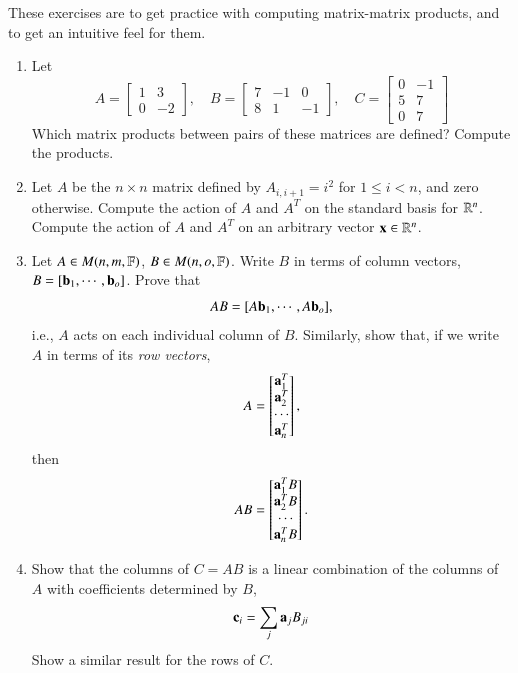 \documentclass[12pt]{report}
\begin{document}
These exercises are to get practice with computing matrix-matrix products, and to get an intuitive feel for them.
\begin{enumerate}
    \item {} Let 
    \begin{equation}
        A = \begin{bmatrix} 1 & 3 \\ 0 & -2 \end{bmatrix}, \quad B = \begin{bmatrix} 7 & -1 & 0 \\ 8 & 1 & -1 \end{bmatrix}, \quad C = \begin{bmatrix} 0 & -1 \\ 5 & 7 \\ 0 & 7 \end{bmatrix}
    \end{equation}
    Which matrix products between pairs of these matrices are defined? Compute the products.
    \item{} 
    Let $A$ be the $n\times n$ matrix defined by $A_{i,i+1} = i^2$ for $1 \leq i < n$, and zero otherwise. Compute the action of $A$ and $A^T$ on the standard basis for $\mathbb{R}^n$. Compute the action of $A$ and $A^T$ on an arbitrary vector $\mathbf{x}\in \mathbb{R}^n$.
    \item
    Let $A \in M(n,m,\mathbb{F})$, $B \in M(n,o,\mathbb{F})$. Write $B$ in terms of column vectors, $B = [\mathbf{b}_1,\cdots,\mathbf{b}_o]$. Prove that
    \begin{equation}
        AB = [A\mathbf{b}_1, \cdots, A\mathbf{b}_o],
    \end{equation}
    i.e., $A$ acts on each individual column of $B$.     
    Similarly, show that, if we write $A$ in terms of its \emph{row vectors},
    \begin{equation}
        A = \begin{bmatrix} \mathbf{a}_1^T \\ \mathbf{a}_2^T \\ \cdots \\ \mathbf{a}_n^T \end{bmatrix},
    \end{equation}
    then
    \begin{equation}
        AB = \begin{bmatrix} \mathbf{a}_1^T B \\ \mathbf{a}_2^T B \\ \cdots \\ \mathbf{a}_n^T B  \end{bmatrix}.
    \end{equation}
    \item Show that the columns of $C = AB$ is a linear combination of the columns of $A$ with coefficients determined by $B$, 
    \begin{equation}
        \mathbf{c}_i = \sum_j \mathbf{a}_j B_{ji}
    \end{equation}
    Show a similar result for the rows of $C$.    
\end{enumerate}
\end{document}
